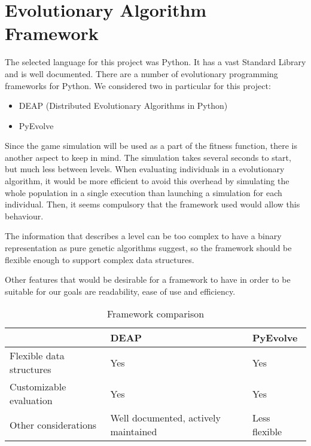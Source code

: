 \chapter{Evolutionary Algorithm Framework}\label{ch:frameworkSelection}

The selected language for this project was Python. It has a vast Standard Library and is well documented. There are a number of evolutionary programming frameworks for Python. We considered two in particular for this project: %

\begin{itemize}
	\item DEAP (Distributed Evolutionary Algorithms in Python)\cite{fortin2012deap}
	\item PyEvolve\cite{perone2009pyevolve}
\end{itemize}

Since the game simulation will be used as a part of the fitness function, there is another aspect to keep in mind. The simulation takes several seconds to start, but much less between levels. When evaluating individuals in a evolutionary algorithm, it would be more efficient to avoid this overhead by simulating the whole population in a single execution than launching a simulation for each individual. Then, it seems compulsory that the framework used would allow this behaviour.

The information that describes a level can be too complex to have a binary representation as pure genetic algorithms suggest, so the framework should be flexible enough to support complex data structures. 

Other features that would be desirable for a framework to have in order to be suitable for our goals are readability, ease of use and efficiency.

\begin{table}
	\myfloatalign
	 \begin{tabularx}{\textwidth}{XXX} \toprule
	
		& \textbf{DEAP}&\textbf{PyEvolve}\\ \midrule
		Flexible data \newline structures  & Yes & Yes\\ \midrule
		Customizable \linebreak evaluation & Yes & Yes\\ \midrule
		Other \linebreak considerations & Well documented, \linebreak actively maintained &Less flexible\\ 
	\bottomrule
	\end{tabularx}
\caption{Framework comparison}
\label{t:framework}
\end{table}

